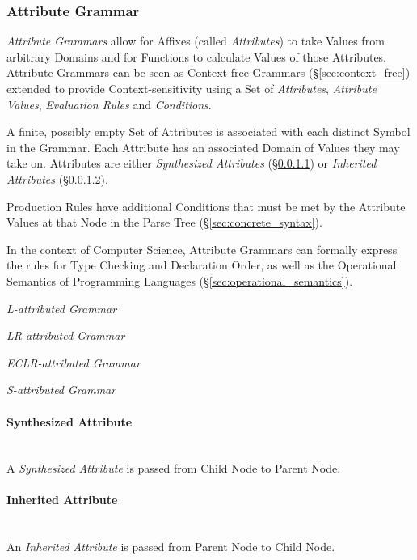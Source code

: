 \subsubsection{Attribute Grammar}\label{sec:attribute_grammar}
\cite{slonneger-kurtz95}

\emph{Attribute Grammars} allow for Affixes (called \emph{Attributes})
to take Values from arbitrary Domains and for Functions to calculate
Values of those Attributes. Attribute Grammars can be seen as
Context-free Grammars (\S\ref{sec:context_free}) extended to provide
Context-sensitivity using a Set of \emph{Attributes}, \emph{Attribute
  Values}, \emph{Evaluation Rules} and \emph{Conditions}.

A finite, possibly empty Set of Attributes is associated with each
distinct Symbol in the Grammar. Each Attribute has an associated
Domain of Values they may take on. Attributes are either
\emph{Synthesized Attributes} (\S\ref{sec:synthesized_attribute}) or
\emph{Inherited Attributes} (\S\ref{sec:inherited_attribute}).

Production Rules have additional Conditions that must be met by the
Attribute Values at that Node in the Parse Tree
(\S\ref{sec:concrete_syntax}).

In the context of Computer Science, Attribute Grammars can formally
express the rules for Type Checking and Declaration Order, as well as
the Operational Semantics of Programming Languages
(\S\ref{sec:operational_semantics}).

\emph{L-attributed Grammar}

\emph{LR-attributed Grammar}

\emph{ECLR-attributed Grammar}

\emph{S-attributed Grammar}



\paragraph{Synthesized Attribute}\label{sec:synthesized_attribute}
\hfill \\
A \emph{Synthesized Attribute} is passed from Child Node to Parent
Node.



\paragraph{Inherited Attribute}\label{sec:inherited_attribute}
\hfill \\
An \emph{Inherited Attribute} is passed from Parent Node to Child
Node.



